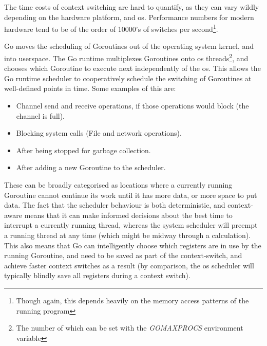 The time costs of context switching are hard to quantify, as they can vary
wildly depending on the hardware platform, and \gls{os}. Performance
numbers for modern hardware tend to be of the order of 10000's of switches per
second\footnote{Though again, this depends heavily on the memory access patterns
of the running program}.

Go moves the scheduling of Goroutines out of the operating system kernel, and
into userspace. The Go runtime multiplexes Goroutines onto \gls{os}
threads\footnote{The number of which can be set with the \textit{GOMAXPROCS}
environment variable}, and chooses which Goroutine to execute next independently
of the \gls{os}. This allows the Go runtime scheduler to cooperatively schedule
the switching of Goroutines at well-defined points in time. Some examples of
this are\cite{performanceWithoutTheEventLoop}:

\begin{itemize}
  \item Channel send and receive operations, if those operations would block (the channel is full).
  \item Blocking system calls (File and network operations).
  \item After being stopped for garbage collection.
  \item After adding a new Goroutine to the scheduler.
\end{itemize}

These can be broadly categorised as locations where a currently running
Goroutine cannot continue its work until it has more data, or more space to put
data. The fact that the scheduler behaviour is both deterministic, and
context-aware means that it can make informed decisions about the best time to
interrupt a currently running thread, whereas the system scheduler will preempt
a running thread at any time (which might be midway through a calculation). This
also means that Go can intelligently choose which registers are in use by the
running Goroutine, and need to be saved as part of the context-switch, and
achieve faster context switches as a result (by comparison, the \gls{os}
scheduler will typically blindly save all registers during a context switch).
